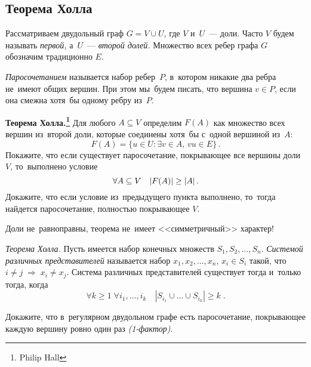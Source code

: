 \subsection*{Теорема Холла}

Рассматриваем двудольный граф $G = V \cup U$, где $V$ и~$U$~--- доли.
Часто $V$ будем называть \emph{первой,} а~$U$~--- \emph{второй долей.}
Множество всех ребер графа $G$ обозначим традиционно $E$.

\emph{Паросочетанием} называется набор ребер~$P$, в~котором никакие два ребра
не~имеют общих вершин.
При этом мы~будем писать, что вершина $v \in P$, если она смежна хотя~бы одному
ребру из~$P$.

\begin{problems}

\item\textbf{Теорема Холла.\footnote{Philip Hall}}
Для любого $A \subseteq V$ определим $F(A)$ как множество всех вершин из~второй
доли, которые соединены хотя~бы с~одной вершиной из~$A$:
\[
    F(A)
=
    \{
        u \in U
    \colon
        \exists v \in A
    ,\,
        vu \in E
    \}
\,.\]
\subproblem
Покажите, что если существует паросочетание, покрывающее все вершины доли~$V$,
то~выполнено условие
\[
    \forall A \subseteq V
\quad
    \lvert F(A) \rvert \geq \lvert A \rvert
\,.\]
\subproblem
Докажите, что если условие из~предыдущего пункта выполнено, то~тогда найдется
паросочетание, полностью покрывающее $V$.

\end{problems}

Доли не~равноправны, теорема не~имеет <<симметричный>> характер!

\begin{problems}

\item\emph{Теорема Холла.}
Пусть имеется набор конечных множеств $S_1, S_2, \ldots, S_n$.
\emph{Системой различных представителей} называется набор
$x_1, x_2, \ldots, x_n$, $x_i \in S_i$ такой, что
\(
    i \neq j
\;\Rightarrow\;
    x_i \neq x_j
\).
Система различных представителей существует тогда и~только тогда, когда
\[
    \forall k \geq 1
\;
    \forall i_1, \ldots, i_k
\quad
    |S_{i_1} \cup \ldots \cup S_{i_k}| \geq k
\;.\]

\item
Докажите, что в~регулярном двудольном графе есть паросочетание, покрывающее
каждую вершину ровно один раз \emph{(1-фактор)}.

\end{problems}

